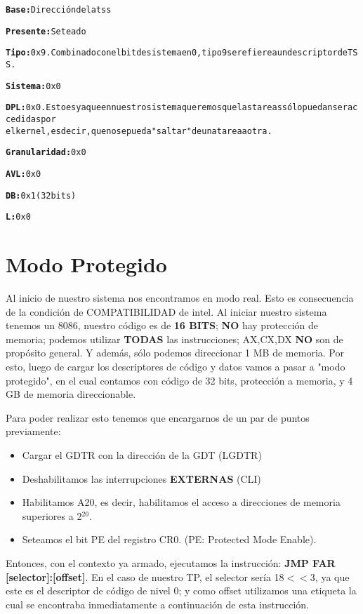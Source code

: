{\begin{alltt}
         \textbf{Base:} Dirección de la tss
                     
         \textbf{Presente:} Seteado
                     
         \textbf{Tipo:} 0x9. Combinado con el bit de sistema en 0, tipo 9 se refiere a un descriptor de TSS.
                
         \textbf{Sistema:} 0x0
                     
         \textbf{DPL:} 0x0. Esto es ya que en nuestro sistema queremos que las tareas sólo puedan ser accedidas por
         el kernel, es decir, que no se pueda "saltar" de una tarea a otra.
			 	
         \textbf{Granularidad:} 0x0
                     
         \textbf{AVL:} 0x0
                     
         \textbf{DB:} 0x1 (32 bits)
                     
         \textbf{L:} 0x0
\end{alltt}
}

\section{Modo Protegido}
\par{Al inicio de nuestro sistema nos encontramos en modo real. Esto es consecuencia de la condición de COMPATIBILIDAD de intel. Al iniciar nuestro sistema tenemos un 8086, nuestro código es de \textbf{16 BITS}; \textbf{NO} hay protección de memoria; podemos utilizar \textbf{TODAS} las instrucciones; AX,CX,DX \textbf{NO} son de propósito general. Y además, sólo podemos direccionar 1 MB de memoria. Por esto, luego de cargar los descriptores de código y datos vamos a pasar a "modo protegido", en el cual contamos con código de 32 bits, protección a memoria, y 4 GB de memoria direccionable.
}
\par{
Para poder realizar esto tenemos que encargarnos de un par de puntos previamente:
\begin{itemize}
\item Cargar el GDTR con la dirección de la GDT (LGDTR)
\item Deshabilitamos las interrupciones \textbf{EXTERNAS} (CLI)
\item Habilitamos A20, es decir, habilitamos el acceso a direcciones de memoria superiores a 2$^{20}$.
\item Seteamos el bit PE del registro CR0. (PE: Protected Mode Enable).
\end{itemize}
Entonces, con el contexto ya armado, ejecutamos la instrucción: \textbf{JMP FAR [selector]:[offset]}. En el caso de nuestro TP, el selector sería 18$<<$3, ya que este es el descriptor de código de nivel 0; y como offset utilizamos una etiqueta la cual se encontraba inmediatamente a continuación de esta instrucción.
}

\clearpage